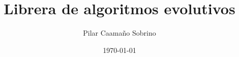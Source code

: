 \documentclass[11pt]{book}
\begin{document}
\title{Librera de algoritmos evolutivos}
\author{Pilar Caamaño Sobrino}
\date{\today}
\maketitle

\tableofcontents





\end{document}
